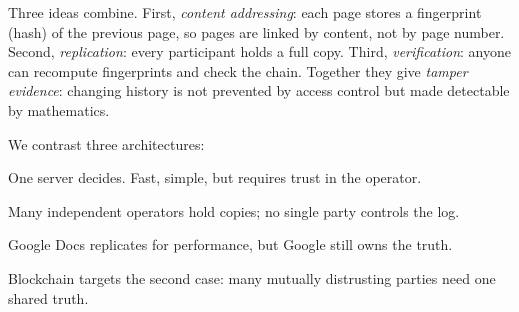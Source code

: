Three ideas combine. First, \emph{content addressing}: each page stores a fingerprint (hash) of the previous page, so pages are linked by content, not by page number. Second, \emph{replication}: every participant holds a full copy. Third, \emph{verification}: anyone can recompute fingerprints and check the chain. Together they give \emph{tamper evidence}: changing history is not prevented by access control but made detectable by mathematics.

We contrast three architectures:
\begin{description}[leftmargin=1.2em,style=nextline]
    \item[Centralised] One server decides. Fast, simple, but requires trust in the operator.
    \item[Decentralised] Many independent operators hold copies; no single party controls the log.
    \item[Distributed but trusted] Google Docs replicates for performance, but Google still owns the truth.
\end{description}
Blockchain targets the second case: many mutually distrusting parties need one shared truth.

